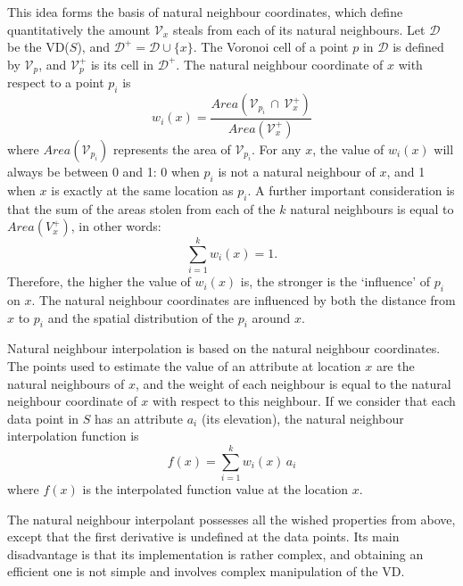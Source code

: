 This idea forms the basis of natural neighbour coordinates, which define quantitatively the amount $\mathcal{V}_{x}$ steals from each of its natural neighbours. 
Let $\mathcal{D}$ be the VD($S$), and $\mathcal{D}^{+} = \mathcal{D} \cup \{x\}$. 
The Voronoi cell of a point $p$ in $\mathcal{D}$ is defined by $\mathcal{V}_{p}$, and $\mathcal{V}^{+}_{p}$ is its cell in $\mathcal{D}^{+}$. 
The natural neighbour coordinate of $x$ with respect to a point $p_{i}$ is
\begin{equation}
  w_{i}(x) = \frac{Area(\mathcal{V}_{p_{i}} \, \cap \, \mathcal{V}^{+}_{x})}{Area(\mathcal{V}^{+}_{x})}
  \label{eq:nnc}
\end{equation}
where $Area(\mathcal{V}_{p_{i}})$ represents the area of $\mathcal{V}_{p_{i}}$. 
For any $x$, the value of $w_{i}(x)$ will always be between 0 and 1: 0 when $p_{i}$ is not a natural neighbour of $x$, and 1 when $x$ is exactly at the same location as $p_{i}$. 
A further important consideration is that the sum of the areas stolen from each of the $k$ natural neighbours is equal to $Area(V^{+}_{x})$, in other words:
\begin{equation}
  \sum_{i=1}^{k} w_{i}(x) = 1.
\end{equation}
Therefore, the higher the value of $w_{i}(x)$ is, the stronger is the `influence' of $p_{i}$ on $x$. 
The natural neighbour coordinates are influenced by both the distance from $x$ to $p_{i}$ and the spatial distribution of the $p_{i}$ around $x$. 

%

Natural neighbour interpolation is based on the natural neighbour coordinates. 
The points used to estimate the value of an attribute at location $x$ are the natural neighbours of $x$, and the weight of each neighbour is equal to the natural neighbour coordinate of $x$ with respect to this neighbour. 
If we consider that each data point in $S$ has an attribute $a_{i}$ (its elevation), the natural neighbour interpolation function is
\begin{equation}
  f(x) = \sum_{i=1}^{k} w_{i}(x) \, a_{i}
  \label{eq:nni}
\end{equation}
where $f(x)$ is the interpolated function value at the location $x$. 

The natural neighbour interpolant possesses all the wished properties from above, except that the first derivative is undefined at the data points. 
Its main disadvantage is that its implementation is rather complex, and obtaining an efficient one is not simple and involves complex manipulation of the VD.



